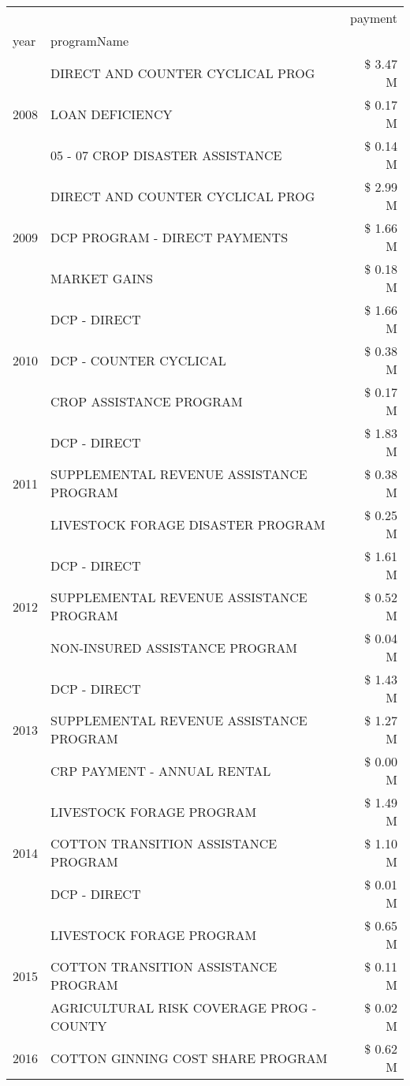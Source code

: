 \begin{tabular}{llr}
\toprule
 &  & payment \\
year & programName &  \\
\midrule
\multirow[t]{3}{*}{2008} & DIRECT AND COUNTER CYCLICAL PROG & \$ 3.47 M \\
 & LOAN DEFICIENCY & \$ 0.17 M \\
 & 05 - 07 CROP DISASTER ASSISTANCE & \$ 0.14 M \\
\cline{1-3}
\multirow[t]{3}{*}{2009} & DIRECT AND COUNTER CYCLICAL PROG & \$ 2.99 M \\
 & DCP PROGRAM - DIRECT PAYMENTS & \$ 1.66 M \\
 & MARKET GAINS & \$ 0.18 M \\
\cline{1-3}
\multirow[t]{3}{*}{2010} & DCP - DIRECT & \$ 1.66 M \\
 & DCP - COUNTER CYCLICAL & \$ 0.38 M \\
 & CROP ASSISTANCE PROGRAM & \$ 0.17 M \\
\cline{1-3}
\multirow[t]{3}{*}{2011} & DCP - DIRECT & \$ 1.83 M \\
 & SUPPLEMENTAL REVENUE ASSISTANCE PROGRAM & \$ 0.38 M \\
 & LIVESTOCK FORAGE DISASTER PROGRAM & \$ 0.25 M \\
\cline{1-3}
\multirow[t]{3}{*}{2012} & DCP - DIRECT & \$ 1.61 M \\
 & SUPPLEMENTAL REVENUE ASSISTANCE PROGRAM & \$ 0.52 M \\
 & NON-INSURED ASSISTANCE PROGRAM & \$ 0.04 M \\
\cline{1-3}
\multirow[t]{3}{*}{2013} & DCP - DIRECT & \$ 1.43 M \\
 & SUPPLEMENTAL REVENUE ASSISTANCE PROGRAM & \$ 1.27 M \\
 & CRP PAYMENT - ANNUAL RENTAL & \$ 0.00 M \\
\cline{1-3}
\multirow[t]{3}{*}{2014} & LIVESTOCK FORAGE PROGRAM & \$ 1.49 M \\
 & COTTON TRANSITION ASSISTANCE PROGRAM & \$ 1.10 M \\
 & DCP - DIRECT & \$ 0.01 M \\
\cline{1-3}
\multirow[t]{3}{*}{2015} & LIVESTOCK FORAGE PROGRAM & \$ 0.65 M \\
 & COTTON TRANSITION ASSISTANCE PROGRAM & \$ 0.11 M \\
 & AGRICULTURAL RISK COVERAGE PROG - COUNTY & \$ 0.02 M \\
\cline{1-3}
\multirow[t]{3}{*}{2016} & COTTON GINNING COST SHARE PROGRAM & \$ 0.62 M \\

\end{tabular}
